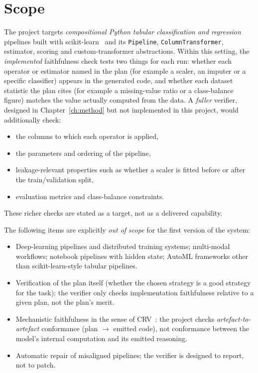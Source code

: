 \section{Scope}

The project targets \emph{compositional Python tabular classification
and regression} pipelines built with scikit-learn~\cite{sklearn}
and its \texttt{Pipeline}, \texttt{ColumnTransformer}, estimator,
scoring and custom-transformer abstractions. Within this setting,
the \emph{implemented} faithfulness check tests two things for each
run: whether each operator or estimator named in the plan (for
example a scaler, an imputer or a specific classifier) appears in the
generated code, and whether each dataset statistic the plan cites
(for example a missing-value ratio or a class-balance figure)
matches the value actually computed from the data. A \emph{fuller}
verifier, designed in Chapter~\ref*{ch:method} but not implemented
in this project, would additionally check:
\begin{itemize}
    \item the columns to which each operator is applied,
    \item the parameters and ordering of the pipeline,
    \item leakage-relevant properties such as whether a scaler is
    fitted before or after the train/validation split,
    \item evaluation metrics and class-balance constraints.
\end{itemize}
These richer checks are stated as a target, not as a delivered
capability.

The following items are explicitly \emph{out of scope} for the first
version of the system:
\begin{itemize}
\raggedright
    \item Deep-learning pipelines and distributed training systems;
    multi-modal workflows; notebook pipelines with hidden state;
    AutoML frameworks other than scikit-learn-style tabular
    pipelines.
    \item Verification of the plan itself (whether the chosen
    strategy is a good strategy for the task): the verifier only
    checks implementation faithfulness relative to a given plan, not
    the plan's merit.
    \item Mechanistic faithfulness in the sense of
    CRV~\cite{zhao2026crv}: the project checks
    \emph{artefact-to-artefact} conformance (plan $\to$ emitted code), not conformance
    between the model's internal computation and its emitted
    reasoning.
    \item Automatic repair of misaligned pipelines; the verifier is
    designed to report, not to patch.
\end{itemize}

